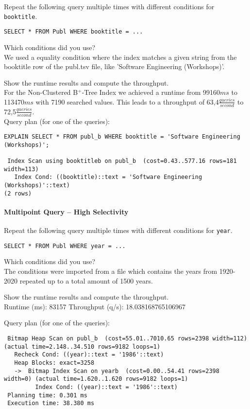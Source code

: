 \documentclass[11pt]{scrartcl}
\begin{document}
Repeat the following query multiple times with different conditions for {\tt booktitle}.

{\small
\begin{verbatim}
SELECT * FROM Publ WHERE booktitle = ...
\end{verbatim}
}

\noindent
Which conditions did you use?\\
We used a equality condition where the index matches a given string from the booktitle row of the publ.tsv file, like 'Software Engineering (Workshops)'.

\smallskip\noindent
Show the runtime results and compute the throughput.\\
For the Non-Clustered B$^+$-Tree Index we achieved a runtime from 99160$ms$ to 113470$ms$ with 7190 searched values.
This leads to a throughput of 63,4$\frac{queries}{second}$ to 72,5$\frac{queries}{second}$.\\

\smallskip\noindent
Query plan (for one of the queries):
\begin{verbatim}
EXPLAIN SELECT * FROM publ_b WHERE booktitle = 'Software Engineering (Workshops)';

 Index Scan using booktitleb on publ_b  (cost=0.43..577.16 rows=181 width=113)
   Index Cond: ((booktitle)::text = 'Software Engineering (Workshops)'::text)
(2 rows)
\end{verbatim}



\paragraph{Multipoint Query -- High Selectivity}

Repeat the following query multiple times with different conditions for {\tt year}.

{\small
\begin{verbatim}
SELECT * FROM Publ WHERE year = ...
\end{verbatim}
}

\noindent
Which conditions did you use?\\
The conditions were imported from a file which contains the years from 1920-2020 repeated up to a total amount of 1500 years.

\smallskip\noindent
Show the runtime results and compute the throughput.\\
Runtime (ms): 83157
Throughput (q/s): 18.038168765106967

\smallskip\noindent
Query plan (for one of the queries):
{\small
\begin{verbatim}
 Bitmap Heap Scan on publ_b  (cost=55.01..7010.65 rows=2398 width=112) (actual time=2.148..34.510 rows=9182 loops=1)
   Recheck Cond: ((year)::text = '1986'::text)
   Heap Blocks: exact=3258
   ->  Bitmap Index Scan on yearb  (cost=0.00..54.41 rows=2398 width=0) (actual time=1.620..1.620 rows=9182 loops=1)
         Index Cond: ((year)::text = '1986'::text)
 Planning time: 0.301 ms
 Execution time: 38.380 ms
\end{verbatim}
}
\end{document}
